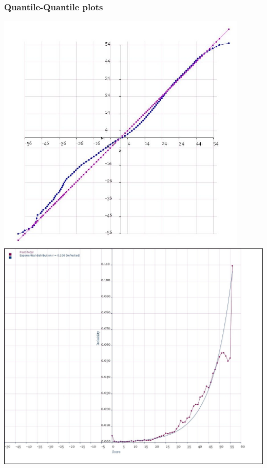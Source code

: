 \documentclass[10pt]{article}
\begin{document}
\subsubsection{Quantile-Quantile plots}
\includegraphics[width=120mm]{ReportMedia/NormalProbabilityPlotImprovement.jpg}
\newpage
\includegraphics[width=160mm]{ReportMedia/ExponentialProbabilityPost.jpg}
\newpage
\end{document}
